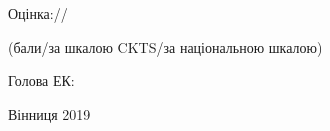 \begin{titlepage}
\vspace{4em}

\begin{flushright}
	\begin{minipage}[c]{0.5\linewidth}
		Оцінка:\underline{\hspace{1cm}}/\underline{\hspace{1cm}}/\underline{\hspace{4cm}}

		\quad{} \quad{} \quad{}  {\tiny(бали/за шкалою CKTS/за національною шкалою)}

		Голова ЕК: \underline{\hspace{5.6cm}}
	\end{minipage}
\end{flushright}

\vspace{\fill}

\begin{center}
	Вінниця 2019
\end{center}

\end{titlepage}